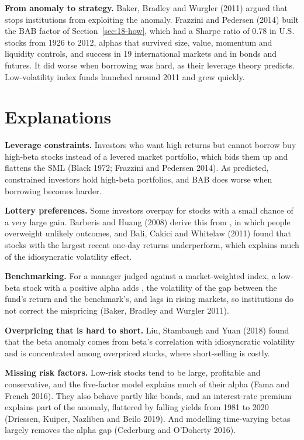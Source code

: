\textbf{From anomaly to strategy.} Baker, Bradley and Wurgler (2011) argued that  stops institutions from exploiting the anomaly. Frazzini and Pedersen (2014) built the BAB factor of Section~\ref{sec:18-how}, which had a Sharpe ratio of 0.78 in U.S. stocks from 1926 to 2012, alphas that survived size, value, momentum and liquidity controls, and success in 19 international markets and in bonds and futures. It did worse when borrowing was hard, as their leverage theory predicts. Low-volatility index funds launched around 2011 and grew quickly.

\section{Explanations}
\label{sec:18-explanations}

\textbf{Leverage constraints.} Investors who want high returns but cannot borrow buy high-beta stocks instead of a levered market portfolio, which bids them up and flattens the SML (Black 1972; Frazzini and Pedersen 2014). As predicted, constrained investors hold high-beta portfolios, and BAB does worse when borrowing becomes harder.

\textbf{Lottery preferences.} Some investors overpay for stocks with a small chance of a very large gain. Barberis and Huang (2008) derive this from , in which people overweight unlikely outcomes, and Bali, Cakici and Whitelaw (2011) found that stocks with the largest recent one-day returns underperform, which explains much of the idiosyncratic volatility effect.

\textbf{Benchmarking.} For a manager judged against a market-weighted index, a low-beta stock with a positive alpha adds , the volatility of the gap between the fund's return and the benchmark's, and lags in rising markets, so institutions do not correct the mispricing (Baker, Bradley and Wurgler 2011).

\textbf{Overpricing that is hard to short.} Liu, Stambaugh and Yuan (2018) found that the beta anomaly comes from beta's correlation with idiosyncratic volatility and is concentrated among overpriced stocks, where short-selling is costly.

\textbf{Missing risk factors.} Low-risk stocks tend to be large, profitable and conservative, and the five-factor model explains much of their alpha (Fama and French 2016). They also behave partly like bonds, and an interest-rate premium explains part of the anomaly, flattered by falling yields from 1981 to 2020 (Driessen, Kuiper, Nazliben and Beilo 2019). And modelling time-varying betas largely removes the alpha gap (Cederburg and O'Doherty 2016).

